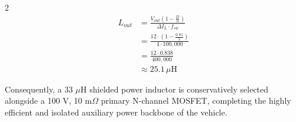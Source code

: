 \begin{multicols}{2}
\begin{equation} \label{eq:inductor_calc}
\begin{split}
L_{out} &= \frac{V_{out} \left( 1 - \frac{D}{n} \right)}{\Delta I_L \cdot f_{sw}} \\
&= \frac{12 \cdot \left( 1 - \frac{0.81}{5} \right)}{4 \cdot 100,000} \\
&= \frac{12 \cdot 0.838}{400,000} \\
&\approx 25.1\,\mu\mathrm{H}
\end{split}
\end{equation}

Consequently, a 33 $\mu$H shielded power inductor is conservatively selected alongside a 100 V, 10 m$\Omega$ primary N-channel MOSFET, completing the highly efficient and isolated auxiliary power backbone of the vehicle.
\end{multicols}
